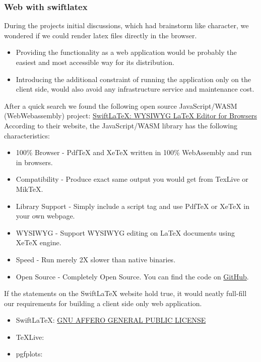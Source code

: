 \subsubsection{Web with swiftlatex}
During the projects initial discussions, which had brainstorm like character, we wondered if we could render latex files directly in the browser.
\begin{itemize}
    \item Providing the functionality as a web application would be probably the easiest and most accessible way for its distribution.
    \item Introducing the additional constraint of running the application only on the client side, would also avoid any infrastructure service and maintenance cost.
\end{itemize}
After a quick search we found the following open source JavaScript/WASM (WebWebassembly) project: \href{https://www.swiftlatex.com/}{SwiftLaTeX: WYSIWYG LaTeX Editor for Browsers}
According to their website, the JavaScript/WASM library has the following characteristics: \cite{swiftlatex_website}
\begin{itemize}
    \item 100\% Browser - PdfTeX and XeTeX written in 100\% WebAssembly and run in browsers.
    \item Compatibility - Produce exact same output you would get from TexLive or MikTeX.
    \item Library Support - Simply include a script tag and use PdfTeX or XeTeX in your own webpage.
    \item WYSIWYG - Support WYSIWYG editing on LaTeX documents using XeTeX engine.
    \item Speed - Run merely 2X slower than native binaries.
    \item Open Source - Completely Open Source. You can find the code on \href{https://github.com/SwiftLaTeX/SwiftLaTeX/}{GitHub}.
\end{itemize}
If the statements on the SwiftLaTeX website hold true, it would neatly full-fill our requirements for building a client side only web application.



\begin{itemize}
    \item SwiftLaTeX: \href{https://github.com/SwiftLaTeX/SwiftLaTeX/blob/master/LICENSE}{GNU AFFERO GENERAL PUBLIC LICENSE}
    \item TeXLive: \href{}{}
    \item pgfplots: \href{}{}
\end{itemize}

